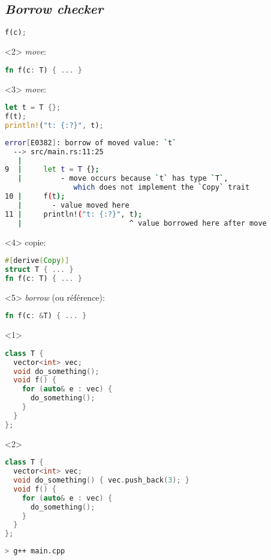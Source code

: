 \subsection{\textit{Borrow checker}}
\begin{frame}[fragile]
  \begin{lstlisting}[language=rust]
f(c);
  \end{lstlisting}
  \begin{onlyenv}<2>
    \textit{move}:
  \begin{lstlisting}[language=rust]
fn f(c: T) { ... }
  \end{lstlisting}
  \end{onlyenv}
  \begin{onlyenv}<3>
    \textit{move}:
  \begin{lstlisting}[language=rust, basicstyle=\small]
let t = T {};
f(t);
println!("t: {:?}", t);
  \end{lstlisting}
  \begin{lstlisting}[language=bash, basicstyle=\tiny]
error[E0382]: borrow of moved value: `t`
  --> src/main.rs:11:25
   |
9  |     let t = T {};
   |         - move occurs because `t` has type `T`,
                which does not implement the `Copy` trait
10 |     f(t);
   |       - value moved here
11 |     println!("t: {:?}", t);
   |                         ^ value borrowed here after move
  \end{lstlisting}
  \end{onlyenv}
  \begin{onlyenv}<4>
    copie:
  \begin{lstlisting}[language=rust]
#[derive(Copy)]
struct T { ... }
fn f(c: T) { ... }
  \end{lstlisting}
  \end{onlyenv}
  \begin{onlyenv}<5>
    \textit{borrow} (ou référence):
  \begin{lstlisting}[language=rust]
fn f(c: &T) { ... }
  \end{lstlisting}
  \end{onlyenv}
\end{frame}
\begin{frame}[fragile]
  \begin{onlyenv}<1>
    \begin{lstlisting}[language=c++]
class T {
  vector<int> vec;
  void do_something();
  void f() {
    for (auto& e : vec) {
      do_something();
    }
  }
};
    \end{lstlisting}
  \end{onlyenv}
  \begin{onlyenv}<2>
    \begin{lstlisting}[language=c++]
class T {
  vector<int> vec;
  void do_something() { vec.push_back(3); }
  void f() {
    for (auto& e : vec) {
      do_something();
    }
  }
};
    \end{lstlisting}
    \begin{lstlisting}[language=bash]
> g++ main.cpp

  \end{lstlisting}
  \end{onlyenv}
\end{frame}
